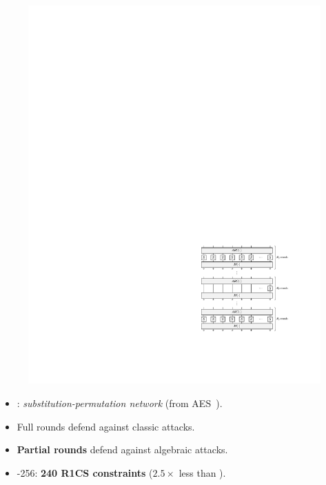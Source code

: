 \documentclass[beamer={10pt,xcolor=dvipsnames},target=mst]{thud}
\begin{document}
\begin{frame}{\Poseidon{}~\cite{GrassiKRRS2021}}
  \begin{figure}
    \centering
    \includegraphics[scale=0.6]{res/GrassiKRRS2021.pdf}
  \end{figure}

  \begin{itemize}
    \item \Poseidon{}: \emph{substitution-permutation network} (from AES~\cite{DaemenR1999}).
    \item Full rounds defend against classic attacks.
    \item \textbf{Partial rounds} defend against algebraic attacks.
    \item \Poseidon{}-256: \textbf{240 R1CS constraints} (\(2.5\times \) less than \Mimc).
  \end{itemize}
\end{frame}
\end{document}

